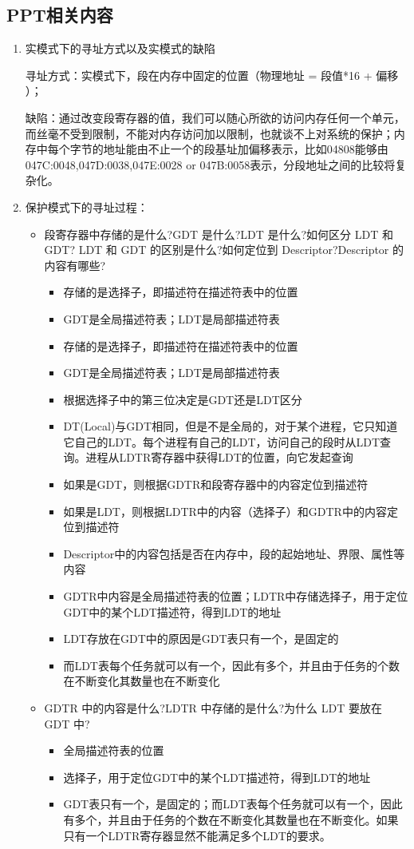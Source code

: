 \documentclass[a4paper]{article}
\begin{document}
\subsection{PPT相关内容}
\begin{enumerate}
	\item 实模式下的寻址方式以及实模式的缺陷
	
	寻址方式：实模式下，段在内存中固定的位置（物理地址 = 段值*16 + 偏移 ）；
	
	缺陷：通过改变段寄存器的值，我们可以随心所欲的访问内存任何一个单元，而丝毫不受到限制，不能对内存访问加以限制，也就谈不上对系统的保护；内存中每个字节的地址能由不止一个的段基址加偏移表示，比如04808能够由047C:0048,047D:0038,047E:0028 or 047B:0058表示，分段地址之间的比较将复杂化。
	
	\item 保护模式下的寻址过程：
	\begin{itemize}
		\item 段寄存器中存储的是什么?GDT 是什么?LDT 是什么?如何区分 LDT 和 GDT? LDT 和 GDT 的区别是什么?如何定位到 Descriptor?Descriptor 的内容有哪些?
		\begin{itemize}
			\item 存储的是选择子，即描述符在描述符表中的位置
			\item GDT是全局描述符表；LDT是局部描述符表
			\item 存储的是选择子，即描述符在描述符表中的位置
			\item GDT是全局描述符表；LDT是局部描述符表
			\item 根据选择子中的第三位决定是GDT还是LDT区分
			\item DT(Local)与GDT相同，但是不是全局的，对于某个进程，它只知道它自己的LDT。每个进程有自己的LDT，访问自己的段时从LDT查询。进程从LDTR寄存器中获得LDT的位置，向它发起查询
			\item 如果是GDT，则根据GDTR和段寄存器中的内容定位到描述符
			\item 如果是LDT，则根据LDTR中的内容（选择子）和GDTR中的内容定位到描述符
			\item Descriptor中的内容包括是否在内存中，段的起始地址、界限、属性等内容
			\item GDTR中内容是全局描述符表的位置；LDTR中存储选择子，用于定位GDT中的某个LDT描述符，得到LDT的地址
			\item LDT存放在GDT中的原因是GDT表只有一个，是固定的
			\item 而LDT表每个任务就可以有一个，因此有多个，并且由于任务的个数在不断变化其数量也在不断变化
		\end{itemize}
		\item GDTR 中的内容是什么?LDTR 中存储的是什么?为什么 LDT 要放在 GDT 中?
		\begin{itemize}
			\item 全局描述符表的位置
			\item 选择子，用于定位GDT中的某个LDT描述符，得到LDT的地址
			\item GDT表只有一个，是固定的；而LDT表每个任务就可以有一个，因此有多个，并且由于任务的个数在不断变化其数量也在不断变化。如果只有一个LDTR寄存器显然不能满足多个LDT的要求。
		\end{itemize}
	\end{itemize}
	

\end{enumerate}
\end{document}
